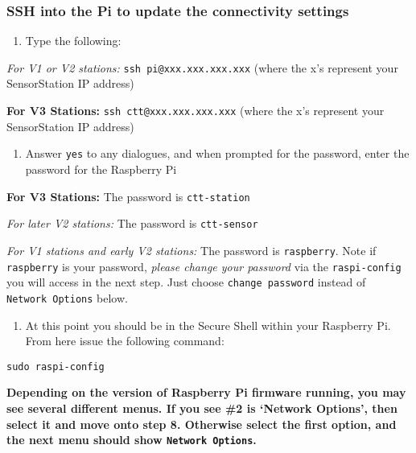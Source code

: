 \documentclass[
]{article}
\providecommand{\tightlist}{%
  \setlength{\itemsep}{0pt}\setlength{\parskip}{0pt}}
\begin{document}
\hypertarget{ssh-into-the-pi-to-update-the-connectivity-settings}{%
\subsubsection{SSH into the Pi to update the connectivity
settings}\label{ssh-into-the-pi-to-update-the-connectivity-settings}}

\begin{enumerate}
\def\labelenumi{\arabic{enumi}.}
\setcounter{enumi}{4}
\tightlist
\item
  Type the following:
\end{enumerate}

\emph{For V1 or V2 stations:} \texttt{ssh\ pi@xxx.xxx.xxx.xxx} (where
the x's represent your SensorStation IP address)

\textbf{For V3 Stations:} \texttt{ssh\ ctt@xxx.xxx.xxx.xxx} (where the
x's represent your SensorStation IP address)

\begin{enumerate}
\def\labelenumi{\arabic{enumi}.}
\setcounter{enumi}{5}
\tightlist
\item
  Answer \texttt{yes} to any dialogues, and when prompted for the
  password, enter the password for the Raspberry Pi
\end{enumerate}

\textbf{For V3 Stations:} The password is \texttt{ctt-station}

\emph{For later V2 stations:} The password is \texttt{ctt-sensor}

\emph{For V1 stations and early V2 stations:} The password is
\texttt{raspberry}. Note if \texttt{raspberry} is your password,
\emph{please change your password} via the \texttt{raspi-config} you
will access in the next step. Just choose \texttt{change\ password}
instead of \texttt{Network\ Options} below.

\begin{enumerate}
\def\labelenumi{\arabic{enumi}.}
\setcounter{enumi}{6}
\tightlist
\item
  At this point you should be in the Secure Shell within your Raspberry
  Pi. From here issue the following command:
\end{enumerate}

\texttt{sudo\ raspi-config}

\textbf{Depending on the version of Raspberry Pi firmware running, you
may see several different menus. If you see \#2 is `Network Options',
then select it and move onto step 8. Otherwise select the first option,
and the next menu should show \texttt{Network\ Options}.}
\end{document}

